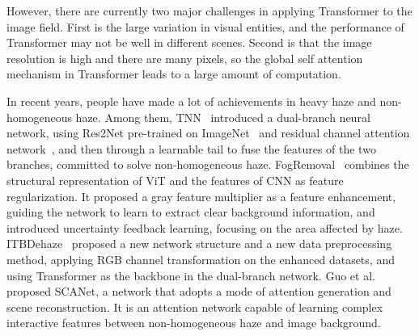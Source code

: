 \documentclass[journal]{IEEEtran}
\begin{document}
However, there are currently two major challenges in applying Transformer to the image field. First is the large variation in visual entities, and the performance of Transformer may not be well in different scenes. Second is that the image resolution is high and there are many pixels, so the global self attention mechanism in Transformer leads to a large amount of computation.

In recent years, people have made a lot of achievements in heavy haze and non-homogeneous haze. Among them, TNN~\cite{yu2021two} introduced a dual-branch neural network, using Res2Net pre-trained on ImageNet~\cite{deng2009imagenet} and residual channel attention network~\cite{zhang2018image}, and then through a learnable tail to fuse the features of the two branches, committed to solve non-homogeneous haze. FogRemoval~\cite{jin2022structure} combines the structural representation of ViT\cite{dosovitskiy2020image} and the features of CNN as feature regularization. It proposed a gray feature multiplier as a feature enhancement, guiding the network to learn to extract clear background information, and introduced uncertainty feedback learning, focusing on the area affected by haze. ITBDehaze~\cite{liu2023data} proposed a new network structure and a new data preprocessing method, applying RGB channel transformation on the enhanced datasets, and using Transformer as the backbone in the dual-branch network. Guo et al.~\cite{guo2023scanet} proposed SCANet, a network that adopts a mode of attention generation and scene reconstruction. It is an attention network capable of learning complex interactive features between non-homogeneous haze and image background.
\end{document}

